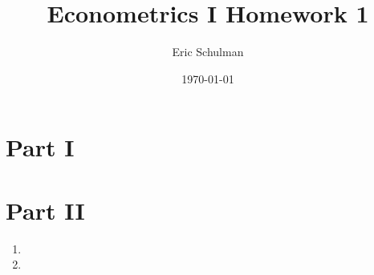 \documentclass{article}
\title{Econometrics I Homework 1}
\author{Eric Schulman}
\date{\today}
\begin{document}
\maketitle

\section{Part I}
\section{Part II}
\begin{enumerate}[label=\alph*)]
\item



\item

\end{enumerate}
\end{document}
